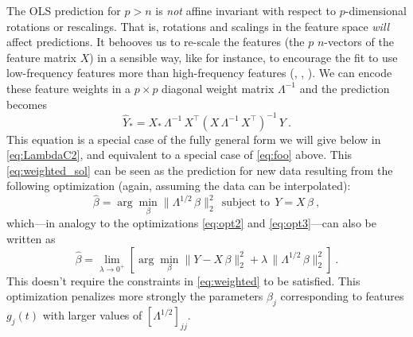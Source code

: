 \documentclass[12pt,letterpaper]{article}
\begin{document}
The OLS prediction for $p>n$ is \emph{not} affine invariant with respect to $p$-dimensional rotations or rescalings.
That is, rotations and scalings in the feature space \emph{will} affect predictions.
It behooves us to re-scale the features (the $p$ $n$-vectors of the feature matrix $X$) in a sensible way, like for instance, to encourage the fit to use low-frequency features more than high-frequency features (\citealt{xie2020weighted}, \citealt{bah2016sample}, \citealt{rauhut2016interpolation}).
We can encode these feature weights in a $p\times p$ diagonal weight matrix $\Lambda^{-1}$ and the prediction becomes
\begin{equation} \label{eq:weighted_sol}
    \hat{Y}_\ast = X_\ast\,\Lambda^{-1}\,X^\top (X\,\Lambda^{-1}\,X^\top)^{-1}\,Y
    ~.
\end{equation}
This equation is a special case of the fully general form we will give below in \eqref{eq:LambdaC2}, and equivalent to a special case of \eqref{eq:foo} above.
This \eqref{eq:weighted_sol} can be seen as the prediction for new data resulting from the following optimization (again, assuming the data can be interpolated):
\begin{equation} \label{eq:weighted}
    \hat{\beta} = \arg\min_\beta \|\Lambda^{1/2}\,\beta\|_2^2 ~~\mbox{subject to}~~ Y = X\,\beta
    ~,
\end{equation}
which---in analogy to the optimizations \eqref{eq:opt2} and \eqref{eq:opt3}---can also be written as
\begin{equation}
    \hat{\beta} = \lim_{\lambda\to 0^+}\left[\arg\min_\beta \|Y - X\,\beta\|_2^2 + \lambda\,\|\Lambda^{1/2}\,\beta\|_2^2\right]
    ~.
\end{equation}
This doesn't require the constraints in \eqref{eq:weighted} to be satisfied. 
This optimization
penalizes more strongly the parameters $\beta_j$ corresponding to features $g_j(t)$ with larger values of $[\Lambda^{1/2}]_{jj}$.
\end{document}
